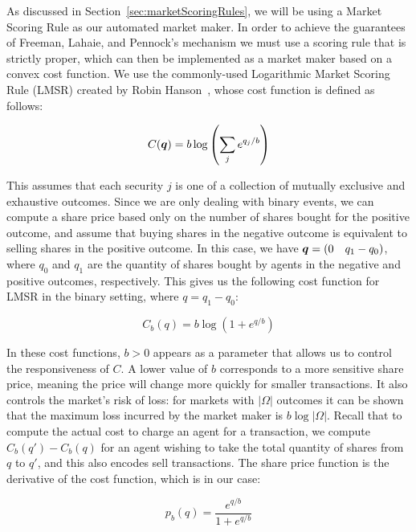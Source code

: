 As discussed in Section~\ref{sec:marketScoringRules}, we will be using a Market
Scoring Rule as our automated market maker. In order to achieve the guarantees
of Freeman, Lahaie, and Pennock's mechanism we must use a scoring rule that is
strictly proper, which can then be implemented as a market maker based on a
convex cost function. We use the commonly-used Logarithmic Market Scoring Rule
(LMSR) created by Robin Hanson~\cite{Hanson2007}, whose cost function is
defined as follows:

\begin{equation}
	\label{eq:LMSR}
	C(\bm{q}) = b \log \left( \sum_j e^{q_j/b} \right)
\end{equation}

This assumes that each security $j$ is one of a collection of mutually
exclusive and exhaustive outcomes. Since we are only dealing with binary
events, we can compute a share price based only on the number of shares bought
for the positive outcome, and assume that buying shares in the negative outcome
is equivalent to selling shares in the positive outcome. In this case, we have
$\bm{q}=( 0 \quad q_1 - q_0 )$, where $q_0$ and $q_1$ are the quantity of
shares bought by agents in the negative and positive outcomes, respectively.
This gives us the following cost function for LMSR in the binary setting, where
$q=q_1-q_0$:

\begin{equation}
	\label{eq:LMSRbinary}
	C_b (q) = b \log (1 + e^{q/b})
\end{equation}

In these cost functions, $b>0$ appears as a parameter that allows us to control
the responsiveness of $C$. A lower value of $b$ corresponds to a more sensitive
share price, meaning the price will change more quickly for smaller
transactions. It also controls the market's risk of loss: for markets with
$|\Omega|$ outcomes it can be shown that the maximum loss incurred by the
market maker is $b \log |\Omega|$. Recall that to compute the actual cost to
charge an agent for a transaction, we compute $C_b(q')-C_b(q)$ for an agent
wishing to take the total quantity of shares from $q$ to $q'$, and this also
encodes sell transactions. The share price function is the derivative of the
cost function, which is in our case:

\begin{equation}
	\label{eq:LMSRprice}
	p_b(q) = \frac{e^{q/b}}{1+e^{q/b}}
\end{equation}

